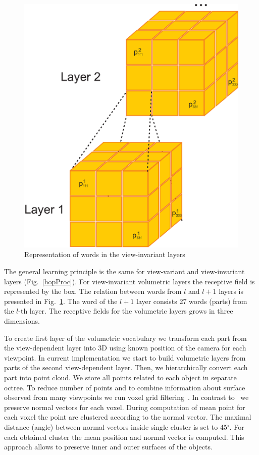 \documentclass[letterpaper,10pt,conference]{ieeeconf}  %
\begin{document}
\begin{figure}[t]
 \centering
\includegraphics[width=0.75\columnwidth]{../images/wordInd.eps}
\caption{Representation of words in the view-invariant layers}
 \label{wordInv}
\end{figure}

The general learning principle is the same for view-variant and view-invariant layers (Fig.~\ref{hopProc}). For view-invariant volumetric layers the receptive field is represented by the box. The relation between words from $l$ and $l+1$ layers is presented in Fig.~\ref{wordInv}. The word of the $l+1$ layer consists 27 words (parts) from the $l$-th layer. The receptive fields for the volumetric layers grows in three dimensions.

To create first layer of the volumetric vocabulary we transform each part from the view-dependent layer into 3D using known position of the camera for each viewpoint. In current implementation we start to build volumetric layers from parts of the second view-dependent layer. Then, we hierarchically convert each part into point cloud. We store all points related to each object in separate octree. To reduce number of points and to combine information about surface observed from many viewpoints we run voxel grid filtering~\cite{Aldoma2012}. In contrast to~\cite{Aldoma2012} we preserve normal vectors for each voxel. During computation of mean point for each voxel the point are clustered according to the normal vector. The maximal distance (angle) between normal vectors inside single cluster is set to 45$^\circ$. For each obtained cluster the mean position and normal vector is computed. This approach allows to preserve inner and outer surfaces of the objects.
\end{document}
